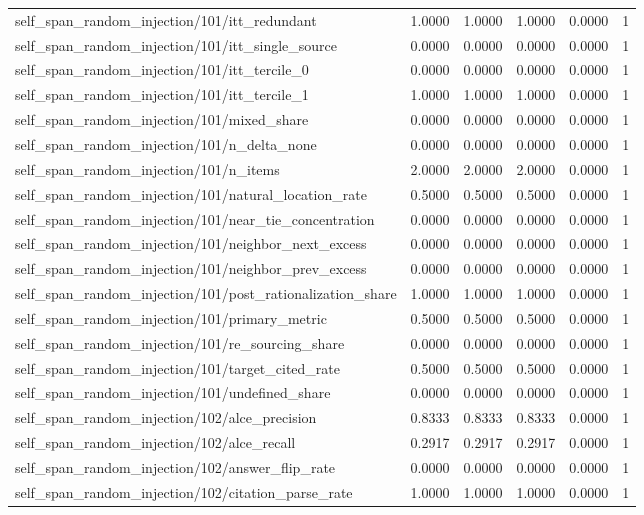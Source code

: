 \begin{table}[h]
\begin{tabular}{lrrrrr}
self_span_random_injection/101/itt_redundant & 1.0000 & 1.0000 & 1.0000 & 0.0000 & 1 \\
self_span_random_injection/101/itt_single_source & 0.0000 & 0.0000 & 0.0000 & 0.0000 & 1 \\
self_span_random_injection/101/itt_tercile_0 & 0.0000 & 0.0000 & 0.0000 & 0.0000 & 1 \\
self_span_random_injection/101/itt_tercile_1 & 1.0000 & 1.0000 & 1.0000 & 0.0000 & 1 \\
self_span_random_injection/101/mixed_share & 0.0000 & 0.0000 & 0.0000 & 0.0000 & 1 \\
self_span_random_injection/101/n_delta_none & 0.0000 & 0.0000 & 0.0000 & 0.0000 & 1 \\
self_span_random_injection/101/n_items & 2.0000 & 2.0000 & 2.0000 & 0.0000 & 1 \\
self_span_random_injection/101/natural_location_rate & 0.5000 & 0.5000 & 0.5000 & 0.0000 & 1 \\
self_span_random_injection/101/near_tie_concentration & 0.0000 & 0.0000 & 0.0000 & 0.0000 & 1 \\
self_span_random_injection/101/neighbor_next_excess & 0.0000 & 0.0000 & 0.0000 & 0.0000 & 1 \\
self_span_random_injection/101/neighbor_prev_excess & 0.0000 & 0.0000 & 0.0000 & 0.0000 & 1 \\
self_span_random_injection/101/post_rationalization_share & 1.0000 & 1.0000 & 1.0000 & 0.0000 & 1 \\
self_span_random_injection/101/primary_metric & 0.5000 & 0.5000 & 0.5000 & 0.0000 & 1 \\
self_span_random_injection/101/re_sourcing_share & 0.0000 & 0.0000 & 0.0000 & 0.0000 & 1 \\
self_span_random_injection/101/target_cited_rate & 0.5000 & 0.5000 & 0.5000 & 0.0000 & 1 \\
self_span_random_injection/101/undefined_share & 0.0000 & 0.0000 & 0.0000 & 0.0000 & 1 \\
self_span_random_injection/102/alce_precision & 0.8333 & 0.8333 & 0.8333 & 0.0000 & 1 \\
self_span_random_injection/102/alce_recall & 0.2917 & 0.2917 & 0.2917 & 0.0000 & 1 \\
self_span_random_injection/102/answer_flip_rate & 0.0000 & 0.0000 & 0.0000 & 0.0000 & 1 \\
self_span_random_injection/102/citation_parse_rate & 1.0000 & 1.0000 & 1.0000 & 0.0000 & 1 \\

\end{tabular}
\end{table}
